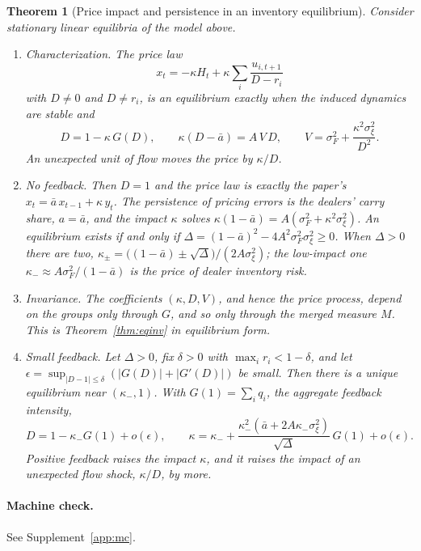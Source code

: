 \documentclass[12pt]{article}
\newtheorem{theorem}{Theorem}[section]
\theoremstyle{definition}
\theoremstyle{remark}
\begin{document}
\begin{theorem}[Price impact and persistence in an inventory equilibrium]\label{thm:inventory}
Consider stationary linear equilibria of the model above.
\begin{enumerate}[label=(\roman*),itemsep=1pt]
\item \emph{Characterization.} The price law
\[
 x_t=-\kappa H_t+\kappa\sum_i\frac{u_{i,t+1}}{D-r_i}
\]
with $D\ne0$ and $D\ne r_i$, is an equilibrium exactly when the induced dynamics are stable and
\begin{equation}\label{eq:inventory_eq}
 D=1-\kappa\,G(D),\qquad \kappa(D-\bar a)=A\,V\,D,\qquad V=\sigma_F^2+\frac{\kappa^2\sigma_\xi^2}{D^2}.
\end{equation}
An unexpected unit of flow moves the price by $\kappa/D$.
\item \emph{No feedback.} Then $D=1$ and the price law is exactly the paper's $x_t=\bar a\,x_{t-1}+\kappa\,y_t$. The persistence of pricing errors is the dealers' carry share, $a=\bar a$, and the impact $\kappa$ solves $\kappa(1-\bar a)=A(\sigma_F^2+\kappa^2\sigma_\xi^2)$. An equilibrium exists if and only if $\Delta=(1-\bar a)^2-4A^2\sigma_F^2\sigma_\xi^2\ge0$. When $\Delta>0$ there are two, $\kappa_\pm=\bigl((1-\bar a)\pm\sqrt\Delta\bigr)/(2A\sigma_\xi^2)$; the low-impact one $\kappa_-\approx A\sigma_F^2/(1-\bar a)$ is the price of dealer inventory risk.
\item \emph{Invariance.} The coefficients $(\kappa,D,V)$, and hence the price process, depend on the groups only through $G$, and so only through the merged measure $M$. This is Theorem~\ref{thm:eqinv} in equilibrium form.
\item \emph{Small feedback.} Let $\Delta>0$, fix $\delta>0$ with $\max_ir_i<1-\delta$, and let $\epsilon=\sup_{|D-1|\le\delta}(|G(D)|+|G'(D)|)$ be small. Then there is a unique equilibrium near $(\kappa_-,1)$. With $G(1)=\sum_iq_i$, the aggregate feedback intensity,
\[
 D=1-\kappa_-G(1)+o(\epsilon),\qquad \kappa=\kappa_-+\frac{\kappa_-^2(\bar a+2A\kappa_-\sigma_\xi^2)}{\sqrt\Delta}\,G(1)+o(\epsilon).
\]
Positive feedback raises the impact $\kappa$, and it raises the impact of an unexpected flow shock, $\kappa/D$, by more.
\end{enumerate}
\end{theorem}

\paragraph{Machine check.} See Supplement~\ref{app:mc}.
\end{document}
